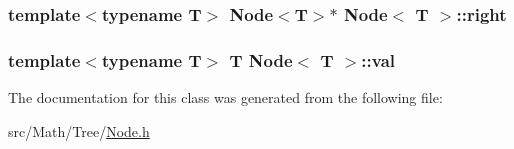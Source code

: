 \subsubsection[{\texorpdfstring{right}{right}}]{\setlength{\rightskip}{0pt plus 5cm}template$<$typename T$>$ {\bf Node}$<$T$>$$\ast$ {\bf Node}$<$ T $>$\+::right}\hypertarget{class_node_ad7092450d89448320103cde1f72da320}{}\label{class_node_ad7092450d89448320103cde1f72da320}
\subsubsection[{\texorpdfstring{val}{val}}]{\setlength{\rightskip}{0pt plus 5cm}template$<$typename T$>$ T {\bf Node}$<$ T $>$\+::val}\hypertarget{class_node_a63ca7703bf78a4ea3f6a7f32a9f705c8}{}\label{class_node_a63ca7703bf78a4ea3f6a7f32a9f705c8}


The documentation for this class was generated from the following file\+:\begin{DoxyCompactItemize}
\item 
src/\+Math/\+Tree/\hyperlink{_node_8h}{Node.\+h}\end{DoxyCompactItemize}
